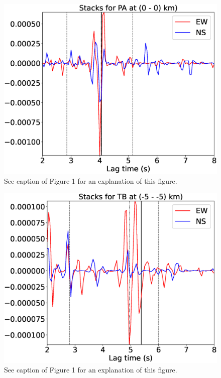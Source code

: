 \documentclass[letterpaper, 12pt]{article}
\begin{document}
\begin{figure}[H]
\includegraphics[width=\linewidth]{figures/intervals/PA_000_000_stacks.eps}
\caption{See caption of Figure 1 for an explanation of this figure.}
\end{figure}

\begin{figure}[H]
\includegraphics[width=\linewidth]{figures/intervals/TB_-05_-05_stacks.eps}
\caption{See caption of Figure 1 for an explanation of this figure.}
\end{figure}
\end{document}
